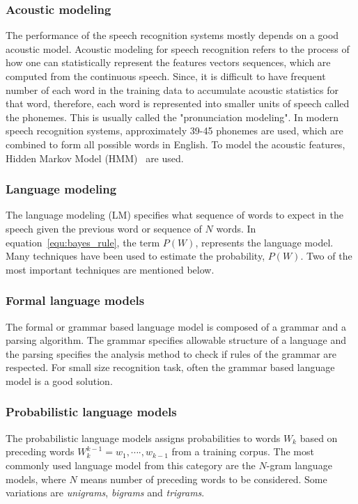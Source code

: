 \documentclass[a4paper, 12pt]{article}
\begin{document}
\subsubsection{Acoustic modeling}
The performance of the speech recognition systems mostly depends on a good acoustic model. Acoustic modeling for speech recognition refers to the process of how one can statistically represent the features vectors sequences, which are computed from the continuous speech. Since, it is difficult to have frequent number of each word in the training data to accumulate acoustic statistics for that word, therefore, each word is represented into smaller units of speech called the phonemes. This is usually called the  "pronunciation modeling". In modern speech recognition systems, approximately 39-45 phonemes are used, which are combined to form all possible words in English. To model the acoustic features, Hidden Markov Model (HMM)~\cite{hmm_for_SR} are used.

\subsubsection{Language modeling}
The language modeling (LM) specifies what sequence of words to expect in the speech given the previous word or sequence of $N$ words. In equation~\ref{equ:bayes_rule}, the term $P(W)$, represents the language model. Many techniques have been used to estimate the probability, $P(W)$. Two of the most important techniques are mentioned below.
\subsubsection*{Formal language models} 
\label{sec:gramar_based_lm}
The formal or grammar based language model is composed of a grammar and a parsing algorithm. The grammar specifies allowable structure of a language and the parsing specifies the analysis method to check if rules of the grammar are respected. For small size recognition task, often the grammar based language model is a good solution. 
\subsubsection*{Probabilistic language models}
\label{sec:prob_lang_model}
The probabilistic language models assigns probabilities to words $\textit{W}_k$ based on preceding words $\textit{W}_k^{k-1} = \textit{w}_1 , \cdots \cdot,\textit{w}_{k-1}$  from a training corpus. The most commonly used language model from this category are the $N$-gram language models, where $N$ means number of preceding words to be considered. Some variations are \textit{unigrams}, \textit{bigrams} and \textit{trigrams}. 
\end{document}
